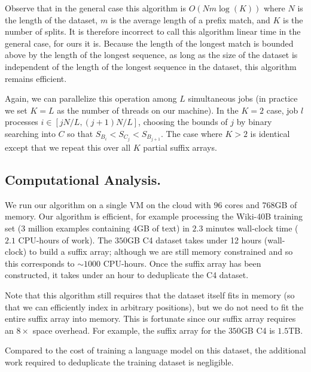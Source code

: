 Observe that in the general case this algorithm is $O(N m \log(K))$ where $N$ is the length
of the dataset, $m$ is the average length of a prefix match, and $K$ is the number of splits.
%
It is therefore incorrect to call this algorithm linear time in the general case, for ours it is.
%
Because the length of the longest match is bounded above by the length of the longest
sequence, as long as the size of the dataset is independent of the length of the 
longest sequence in the dataset, this algorithm remains efficient.

Again, we can parallelize this operation among $L$ simultaneous jobs 
(in practice we set $K=L$ as the number of threads on our machine).
%
In the $K=2$ case, job $l$ processes $i \in [jN/L, (j+1)N/L]$, choosing
the bounds of $j$ by binary searching into $C$ so that $S_{B_{i}} < S_{C_{j}} < S_{B_{j+1}}$.
%
The case where $K>2$ is identical except that we repeat this over all $K$ partial suffix arrays.


\subsection{Computational Analysis.}
We run our algorithm on a single VM on the cloud with $96$ cores and $768$GB of memory.
Our algorithm is efficient, for example processing the Wiki-40B training set ($3$ million
examples containing $4$GB of text) in $2.3$ minutes wall-clock time ($2.1$ CPU-hours of work).
%
The $350$GB C4 dataset takes under 12 hours (wall-clock) to build a suffix array; although we are still memory constrained and so this corresponds to $\sim 1000$ CPU-hours. 
% 
Once the suffix array has been constructed, it takes under an hour to deduplicate the C4 dataset.


Note that this algorithm still requires that the dataset itself fits in memory
(so that we can efficiently index in arbitrary positions), but we do not need to fit the entire suffix array into memory.
This is fortunate since our suffix array requires an $8\times$ space overhead.
For example, the suffix array for the
$350$GB C4 is $1.5$TB.

%

Compared to the cost of training a language model on this dataset, the additional
work required to deduplicate the training dataset is negligible.








